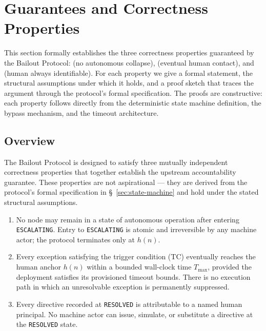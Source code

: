 \section{Guarantees and Correctness Properties}
\label{sec:properties}

This section formally establishes the three correctness properties guaranteed by the Bailout Protocol: \SAFETY{} (no autonomous collapse), \LIVENESS{} (eventual human contact), and \ACCOUNTABILITY{} (human always identifiable). For each property we give a formal statement, the structural assumptions under which it holds, and a proof sketch that traces the argument through the protocol's formal specification. The proofs are constructive: each property follows directly from the deterministic state machine definition, the bypass mechanism, and the timeout architecture.

\subsection{Overview}

The Bailout Protocol is designed to satisfy three mutually independent correctness properties that together establish the upstream accountability guarantee. These properties are not aspirational — they are derived from the protocol's formal specification in \S~\ref{sec:state-machine} and hold under the stated structural assumptions.

\begin{enumerate}
\item[\textbf{SAFETY.}] No \bxthree{} node may remain in a state of autonomous operation after entering \texttt{ESCALATING}. Entry to \texttt{ESCALATING} is atomic and irreversible by any machine actor; the protocol terminates only at $h(n)$.

\item[\textbf{LIVENESS.}] Every exception satisfying the trigger condition (TC) eventually reaches the human anchor $h(n)$ within a bounded wall-clock time $T_{\max}$, provided the deployment satisfies its provisioned timeout bounds. There is no execution path in which an unresolvable exception is permanently suppressed.

\item[\textbf{ACCOUNTABILITY.}] Every directive recorded at \texttt{RESOLVED} is attributable to a named human principal. No machine actor can issue, simulate, or substitute a directive at the \texttt{RESOLVED} state.
\end{enumerate}

